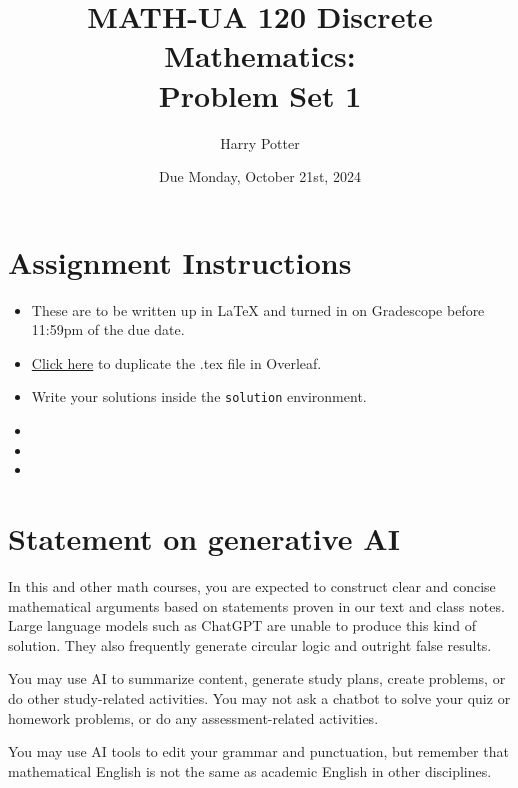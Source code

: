 \documentclass{article}
\title{MATH-UA 120 Discrete Mathematics: \\ Problem Set 1}
\author{%
    Harry Potter %
}
\date{Due Monday, October 21st, 2024}
\theoremstyle{definition}
\begin{document}
\maketitle %


\section*{Assignment Instructions}

\begin{itemize}
    \item These are to be written up in \LaTeX{} and turned in on Gradescope before 11:59pm of the due date.
    \item \href{https://www.google.com}{Click here} to duplicate the .tex file in Overleaf.
    \item Write your solutions inside the \texttt{solution} environment.
    \item 
    \item 
    \item 
\end{itemize}

\vfill

\section*{Statement on generative AI}

In this and other math courses, you are expected to construct clear and concise mathematical arguments based on statements proven in our text and class notes. Large language models such as ChatGPT are unable to produce this kind of solution. They also frequently generate circular logic and outright false results.
 
You may use AI to summarize content, generate study plans, create problems, or do other study-related activities. You may not ask a chatbot to solve your quiz or homework problems, or do any assessment-related activities.
 
You may use AI tools to edit your grammar and punctuation, but remember that mathematical English is not the same as academic English in other disciplines. 

\vfill

\newpage

\end{document}
